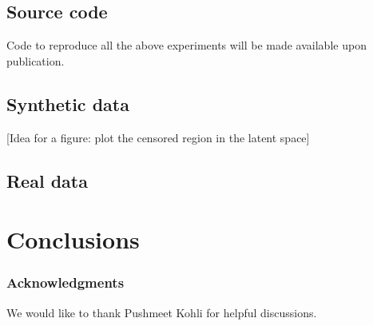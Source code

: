 \documentclass{article}
\begin{document}
\subsection{Source code}

Code to reproduce all the above experiments will be made available upon publication.


\subsection{Synthetic data}



[Idea for a figure: plot the censored region in the latent space]

\subsection{Real data}



\section{Conclusions}

\subsubsection*{Acknowledgments}

We would like to thank Pushmeet Kohli for helpful discussions.



\end{document}
